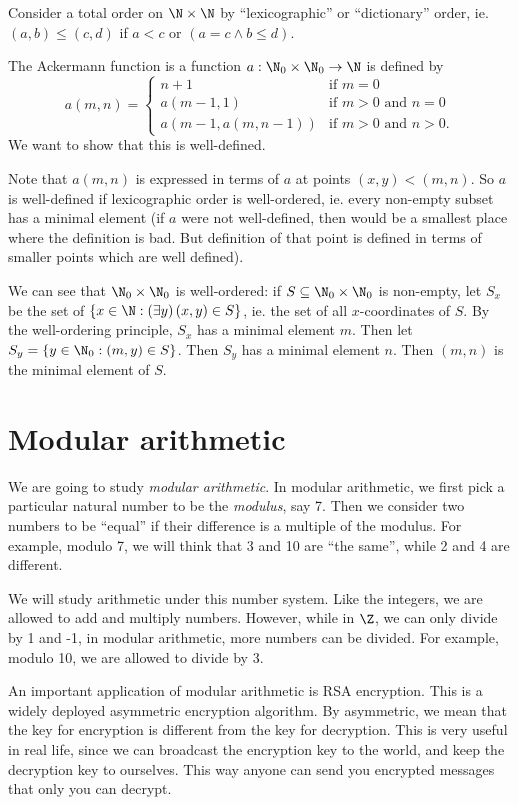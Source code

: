 \documentclass[a4paper]{article}
\begin{document}
\begin{eg}
  Consider a total order on $\N\times \N$ by ``lexicographic'' or ``dictionary'' order, ie. $(a, b) \leq (c, d)$ if $a < c$ or $(a = c\wedge b\leq d)$.

  The Ackermann function is a function $a:\N_0\times \N_0 \to \N$ is defined by
  \[
    a(m, n) =\begin{cases}n+1 & \mbox{if } m = 0 \\a(m-1, 1) & \mbox{if } m > 0 \mbox{ and } n = 0 \\a(m-1, a(m, n-1)) & \mbox{if } m > 0 \mbox{ and } n > 0.\end{cases}
  \]
  We want to show that this is well-defined.

  Note that $a(m, n)$ is expressed in terms of $a$ at points $(x, y) < (m, n)$. So $a$ is well-defined if lexicographic order is well-ordered, ie. every non-empty subset has a minimal element (if $a$ were not well-defined, then would be a smallest place where the definition is bad. But definition of that point is defined in terms of smaller points which are well defined).

  We can see that $\N_0\times \N_0$ is well-ordered: if $S\subseteq \N_0\times \N_0$ is non-empty, let $S_x$ be the set of $\{x\in \N: (\exists y)\,(x, y)\in S\}$, ie. the set of all $x$-coordinates of $S$. By the well-ordering principle, $S_x$ has a minimal element $m$. Then let $S_y = \{y\in \N_0: (m, y)\in S\}$. Then $S_y$ has a minimal element $n$. Then $(m, n)$ is the minimal element of $S$.
\end{eg}

\section{Modular arithmetic}
We are going to study \emph{modular arithmetic}. In modular arithmetic, we first pick a particular natural number to be the \emph{modulus}, say 7. Then we consider two numbers to be ``equal'' if their difference is a multiple of the modulus. For example, modulo 7, we will think that 3 and 10 are ``the same'', while 2 and 4 are different.

We will study arithmetic under this number system. Like the integers, we are allowed to add and multiply numbers. However, while in $\Z$, we can only divide by 1 and -1, in modular arithmetic, more numbers can be divided. For example, modulo 10, we are allowed to divide by 3.

An important application of modular arithmetic is RSA encryption. This is a widely deployed asymmetric encryption algorithm. By asymmetric, we mean that the key for encryption is different from the key for decryption. This is very useful in real life, since we can broadcast the encryption key to the world, and keep the decryption key to ourselves. This way anyone can send you encrypted messages that only you can decrypt.
\end{document}
